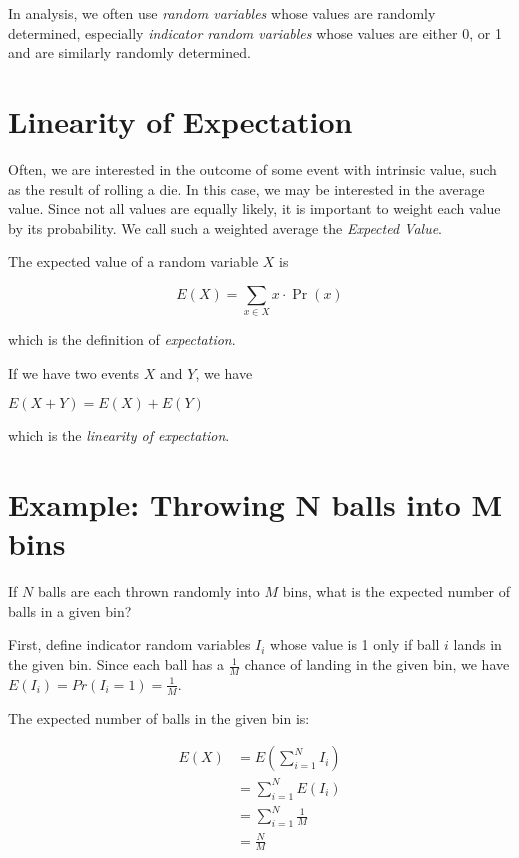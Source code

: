 In analysis, we often use \emph{random variables} whose values are
randomly determined, especially \emph{indicator random variables}
whose values are either 0, or 1 and are similarly randomly determined.

\section{Linearity of Expectation}

Often, we are interested in the outcome of some event with intrinsic
value, such as the result of rolling a die.  In this case, we may be
interested in the average value.  Since not all values are equally
likely, it is important to weight each value by its probability.  We
call such a weighted average the \emph{Expected Value}.

The expected value of a random variable $X$ is

\begin{displaymath}
  E(X) = \sum_{x \in X} x \cdot \Pr(x)
\end{displaymath}

which is the definition of \emph{expectation}.

If we have two events $X$ and $Y$, we have

\begin{center}
\begin{math}
  E(X + Y) = E(X) + E(Y)
\end{math}
\end{center}

which is the \emph{linearity of expectation}.

\section{Example: Throwing N balls into M bins}

If $N$ balls are each thrown randomly into $M$ bins, what is the
expected number of balls in a given bin?

First, define indicator random variables $I_i$ whose value is 1 only
if ball $i$ lands in the given bin.  Since each ball has a
$\frac{1}{M}$ chance of landing in the given bin, we have $E(I_i) =
Pr(I_i = 1) = \frac{1}{M}$.

The expected number of balls in the given bin is:

\begin{align*}
  E(X)
  &= E \left( \sum_{i = 1}^N I_i \right) \\
  &= \sum_{i = 1}^N E(I_i) \\
  &= \sum_{i = 1}^N \frac{1}{M} \\
  &= \frac{N}{M}
\end{align*}


